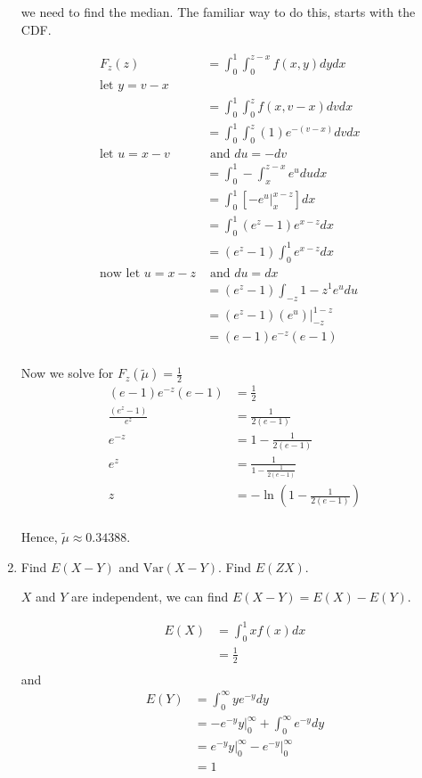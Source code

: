 \documentclass{tufte-book}
\newcommand{\Var}{\mathrm{Var}}
\theoremstyle{mytheoremstyle}
\theoremstyle{mylemstyle}
\theoremstyle{mydefstyle}
\begin{document}
\begin{enumerate}
 we need to find the median.  The familiar way to do this, starts with the CDF.

\begin{align*}
F_z(z) &= \int_0^1 \int_0^{z-x}f(x,y)dydx\\
\text{let $y = v-x$}&\\
&= \int_0^1 \int_0^{z}f(x,v-x)dvdx\\
&= \int_0^1 \int_0^{z}(1)e^{-(v-x)}dvdx\\
\text{let $u=x-v$}& \text{ and $du=-dv$}&\\
&= \int_0^1-\int_x^{z-x}e^ududx\\
&= \int_0^1[-e^u\Big|_x^{x-z}]dx\\
&= \int_0^1 (e^z-1)e^{x-z}dx\\
&= (e^z-1)\int_0^1e^{x-z}dx\\
\text{now let $u=x-z$}& \text{ and $du=dx$}\\
&= (e^z-1)\int_{-z}{1-z}^1e^udu\\
&=(e^z-1)(e^u)\Big|_{-z}^{1-z}\\
&=(e-1)e^{-z}(e-1)\\
\end{align*}

Now we solve for $F_z(\tilde{\mu})=\frac{1}{2}$
\begin{align*}
(e-1)e^{-z}(e-1) &= \frac{1}{2}\\
\frac{(e^z-1)}{e^{z}} &= \frac{1}{2(e-1)}\\
e^{-z} &= 1-\frac{1}{2(e-1)}\\
e^z &= \frac{1}{1-\frac{1}{2(e-1)}}\\
z &= -\ln(1-\frac{1}{2(e-1)})\\
\end{align*}

Hence, $\tilde{\mu}\approx 0.34388$.

\item Find $E(X-Y)$ and $\Var(X-Y)$. Find $E(ZX)$.

 $X$ and $Y$ are independent, we can find $E(X-Y)=E(X)-E(Y)$.

\begin{align*}
E(X) &= \int_0^1xf(x)dx\\
&= \frac{1}{2}\\
\end{align*}
and
\begin{align*}
E(Y)&= \int_0^\infty ye^{-y}dy\\
&=-e^{-y}y\Big|_0^\infty + \int_0^\infty e^{-y}dy\\
&=e^{-y}y\Big|_0^\infty -e^{-y}\Big|_0^{\infty}\\
&= 1\\
\end{align*}


\end{enumerate}
\end{document}
